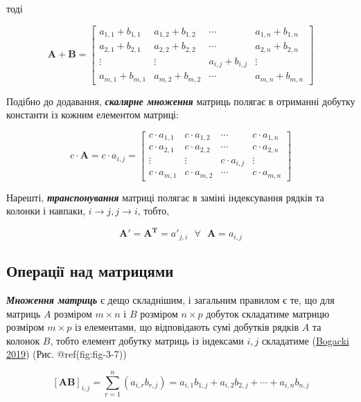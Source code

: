 \documentclass[
  11pt,
]{book}
\begin{document}
тоді

\[\mathbf{A} + \mathbf{B} = \begin{bmatrix}
a_{1, 1}+b_{1, 1} & a_{1,2}+b_{1,2} & \cdots & a_{1, n}+b_{1, n}\\
a_{2, 1}+b_{2, 1} & a_{2,2}+b_{2,2} & \cdots & a_{2, n}+b_{2, n}\\
\vdots & \vdots & a_{i,j}+b_{i,j} & \vdots \\
a_{m, 1}+b_{m, 1} & a_{m,2}+b_{m,2} & \cdots & a_{m, n}+b_{m, n}
\end{bmatrix}\]

Подібно до додавання, \textbf{\emph{скалярне множення}} матриць полягає
в отриманні добутку константи із кожним елементом матриці:

\[c \cdot \mathbf{A} = c \cdot a_{i, j} = \begin{bmatrix}
c \cdot a_{1, 1} & c \cdot a_{1,2} & \cdots & c \cdot a_{1, n}\\
c \cdot a_{2, 1} & c \cdot  a_{2,2} & \cdots & c \cdot a_{2, n}\\
\vdots & \vdots & c \cdot a_{i,j} & \vdots \\
c \cdot a_{m, 1} & c \cdot a_{m,2} & \cdots & c \cdot a_{m, n}
\end{bmatrix}\]

Нарешті, \textbf{\emph{транспонування}} матриці полягає в заміні
індексування рядків та колонки і навпаки,
\(i \rightarrow j, j \rightarrow i\), тобто,

\[\mathbf{A'} = \mathbf{A^T} = a'_{j, i} \text{ } \forall \text{ } \mathbf{A} = a_{i, j}\]

\subsection{Операції над
матрицями}\label{ux43eux43fux435ux440ux430ux446ux456ux457-ux43dux430ux434-ux43cux430ux442ux440ux438ux446ux44fux43cux438}

\textbf{\emph{Множення матриць}} є дещо складнішим, і загальним правилом
є те, що для матриць \(A\) розміром \(m \times n\) і \(B\) розміром
\(n \times p\) добуток складатиме матрицю розміром \(m \times p\) із
елементами, що відповідають сумі добутків рядків \(A\) та колонок \(B\),
тобто елемент добутку матриць із індексами \(i, j\) складатиме
(\href{https://books.google.com/books/about/Linear_Algebra.html?id=P8BZzAEACAAJ}{Bogacki
2019}) (Рис. @ref(fig:fig-3-7))

\[[\mathbf{AB}]_{i, j} = \sum \limits_{r=1}^n (a_{i,r} b_{r, j}) = a_{i,1} b_{1, j} + a_{i, 2}b_{2, j} + \cdots + a_{i, n}b_{n, j}\]
\end{document}
